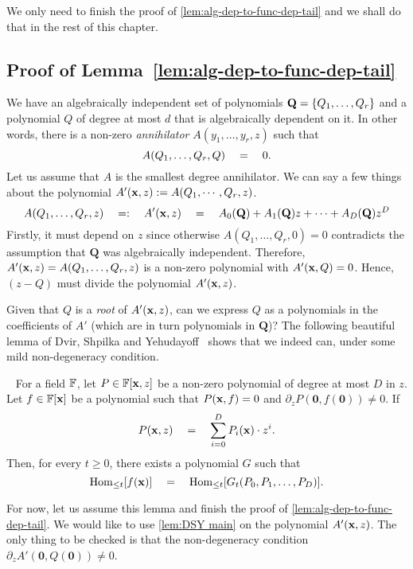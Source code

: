We only need to finish the proof of \autoref{lem:alg-dep-to-func-dep-tail} and we shall do that in the rest of this chapter. 

\subsection{Proof of Lemma~\ref{lem:alg-dep-to-func-dep-tail}}

We have an algebraically independent set of polynomials $\mathbf{Q} = \left\{Q_1,\ldots, Q_r\right\}$ and a polynomial $Q$ of degree at most $d$ that is algebraically dependent on it.
In other words, there is a non-zero \emph{annihilator} $A(y_1,\ldots, y_r,z)$ such that
\[
A(Q_1,\ldots, Q_r, Q) \quad = \quad0. 
\]
Let us assume that $A$ is the smallest degree annihilator.
We can say a few things about the polynomial $A'(\mathbf{x},z) := A(Q_1,\cdots, Q_r, z)$.
\[
A(Q_1,\ldots, Q_r,z) \quad =: \quad A'(\mathbf{x}, z) \quad = \quad A_0(\mathbf{Q}) + A_1(\mathbf{Q}) z + \cdots + A_D(\mathbf{Q}) z^D
\]
Firstly, it must depend on $z$ since otherwise $A(Q_1,\ldots, Q_r,0) = 0$ contradicts the assumption that $\mathbf{Q}$ was algebraically independent.
Therefore, $A'(\mathbf{x}, z) = A(Q_1,\ldots, Q_r,z)$ is a non-zero polynomial with $A'(\mathbf{x}, Q) = 0$.
Hence, $(z - Q)$ must divide the polynomial $A'(\mathbf{x},z)$.

Given that $Q$ is a \emph{root} of $A'(\mathbf{x}, z)$, can we express $Q$ as a polynomials in the coefficients of $A'$ (which are in turn polynomials in $\mathbf{Q}$)? The following beautiful lemma of Dvir, Shpilka and Yehudayoff~\cite{DSY09} shows that we indeed can, under some mild non-degeneracy condition. 

\begin{lemma}~\label{lem:DSY main}
For a field $\mathbb{F}$, let $P \in \mathbb{F}[\mathbf{x}, z]$ be a non-zero polynomial of degree at most $D$ in $z$. Let $f \in \mathbb{F}[\mathbf{x}]$ be a polynomial such that $P(\mathbf{x}, f) = 0$ and $\partial_zP(\mathbf{0}, f(\mathbf{0}))\neq 0$. If 
\[
P(\mathbf{x}, z) \quad = \quad \sum_{i = 0}^D P_i(\mathbf{x})\cdot z^i.
\] 
Then, for every $t \geq 0$, there exists a polynomial $G$ such that 
\[
\operatorname{Hom}_{\leq t}[f(\mathbf{x})] \quad = \quad \operatorname{Hom}_{\leq t}[G_t(P_0, P_1, \ldots, P_D)].
\]
\end{lemma} 

\noindent
For now, let us assume this lemma and finish the proof of \autoref{lem:alg-dep-to-func-dep-tail}. We would like to use \autoref{lem:DSY main} on the polynomial $A'(\mathbf{x}, z)$. The only thing to be checked is that the non-degeneracy condition $\partial_zA' (\mathbf{0}, Q(\mathbf{0})) \neq 0$. 

